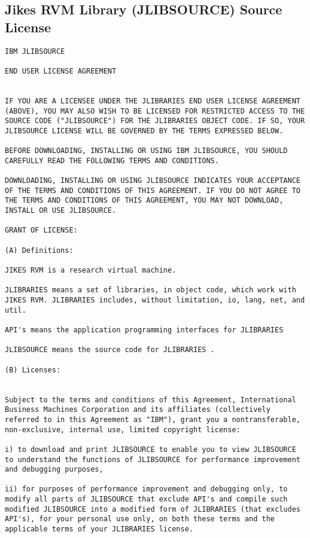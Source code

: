 \subsection{Jikes RVM Library (JLIBSOURCE) Source License}
\begin{verbatim}
IBM JLIBSOURCE 

END USER LICENSE AGREEMENT 


IF YOU ARE A LICENSEE UNDER THE JLIBRARIES END USER LICENSE AGREEMENT
(ABOVE), YOU MAY ALSO WISH TO BE LICENSED FOR RESTRICTED ACCESS TO THE
SOURCE CODE ("JLIBSOURCE") FOR THE JLIBRARIES OBJECT CODE. IF SO, YOUR
JLIBSOURCE LICENSE WILL BE GOVERNED BY THE TERMS EXPRESSED BELOW.

BEFORE DOWNLOADING, INSTALLING OR USING IBM JLIBSOURCE, YOU SHOULD
CAREFULLY READ THE FOLLOWING TERMS AND CONDITIONS.

DOWNLOADING, INSTALLING OR USING JLIBSOURCE INDICATES YOUR ACCEPTANCE
OF THE TERMS AND CONDITIONS OF THIS AGREEMENT. IF YOU DO NOT AGREE TO
THE TERMS AND CONDITIONS OF THIS AGREEMENT, YOU MAY NOT DOWNLOAD,
INSTALL OR USE JLIBSOURCE.

GRANT OF LICENSE: 

(A) Definitions: 

JIKES RVM is a research virtual machine. 

JLIBRARIES means a set of libraries, in object code, which work with
JIKES RVM. JLIBRARIES includes, without limitation, io, lang, net, and
util.

API's means the application programming interfaces for JLIBRARIES 

JLIBSOURCE means the source code for JLIBRARIES . 

(B) Licenses: 


Subject to the terms and conditions of this Agreement, International
Business Machines Corporation and its affiliates (collectively
referred to in this Agreement as "IBM"), grant you a nontransferable,
non-exclusive, internal use, limited copyright license:

i) to download and print JLIBSOURCE to enable you to view JLIBSOURCE
to understand the functions of JLIBSOURCE for performance improvement
and debugging purposes,

ii) for purposes of performance improvement and debugging only, to
modify all parts of JLIBSOURCE that exclude API's and compile such
modified JLIBSOURCE into a modified form of JLIBRARIES (that excludes
API's), for your personal use only, on both these terms and the
applicable terms of your JLIBRARIES license.


\end{verbatim}
